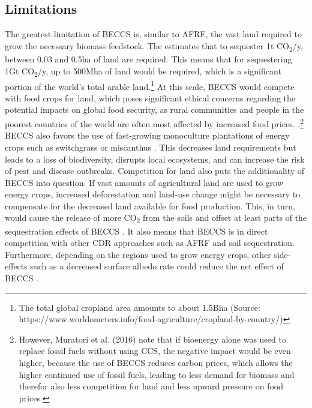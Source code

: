 \subsection*{Limitations}
The greatest limitation of BECCS is, similar to AFRF, the vast land required to grow the necessary biomass feedstock. The \textcite{IPCC2018Global1.5C} estimates that to sequester 1t CO\textsubscript{2}/y, between 0.03 and 0.5ha of land are required. This means that for sequestering 1Gt CO\textsubscript{2}/y, up to 500Mha of land would be required, which is a significant portion of the world's total arable land.\footnote{The total global cropland area amounts to about 1.5Bha (Source: https://www.worldometers.info/food-agriculture/cropland-by-country/)} At this scale, BECCS would compete with food crops for land, which poses significant ethical concerns regarding the potential impacts on global food security, as rural communities and people in the poorest countries of the world are often most affected by increased food prices. \parencite{Anderson2017TheBECCS, Hanssen2020TheStorage}.\footnote{However, Muratori et al. (2016) note that if bioenergy alone was used to replace fossil fuels without using CCS, the negative impact would be even higher, because the use of BECCS reduces carbon prices, which allows the higher continued use of fossil fuels, leading to less demand for biomass and therefor also less competition for land and less upward pressure on food prices.}
BECCS also favors the use of fast-growing monoculture plantations of energy crops such as switchgrass or miscanthus \parencite{Fajardy2017CanEmissions}. This decreases land requirements but leads to a loss of biodiversity, disrupts local ecosystems, and can increase the risk of pest and disease outbreaks.
Competition for land also puts the additionality of BECCS into question. If vast amounts of agricultural land are used to grow energy crops, increased deforestation and land-use change might be necessary to compensate for the decreased land available for food production. This, in turn, would cause the release of more CO\textsubscript{2} from the soils and offset at least parts of the sequestration effects of BECCS \parencite{ChathamHouse2020ReachingWork, Muratori2016GlobalBECCS}. It also means that BECCS is in direct competition with other CDR approaches such as AFRF and soil sequestration.
Furthermore, depending on the regions used to grow energy crops, other side-effects such as a decreased surface albedo rate could reduce the net effect of BECCS \parencite{Hanssen2020TheStorage}.
